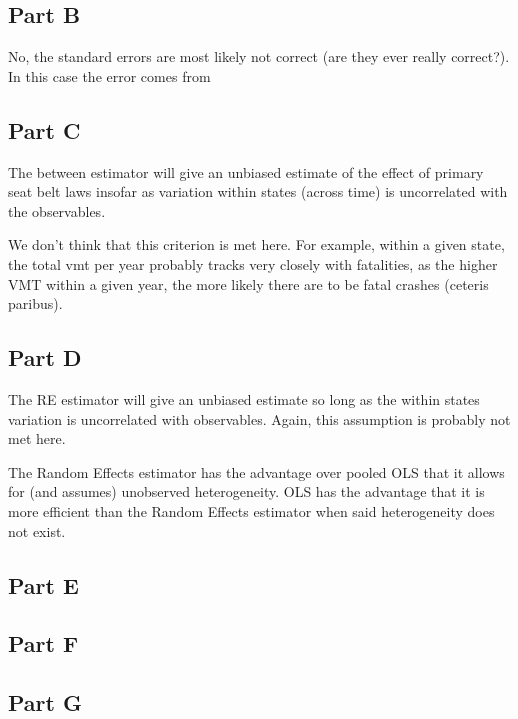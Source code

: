 \documentclass[letterpaper, 12pt]{article}
\begin{document}
\subsection{Part B}
No, the standard errors are most likely not correct (are they ever really correct?).  In this case the error comes from


\subsection{Part C}
The between estimator will give an unbiased estimate of the effect of primary seat belt laws insofar as variation within states (across time) is uncorrelated with the observables.


We don't think that this criterion is met here. For example, within a given state, the total vmt per year probably tracks very closely with fatalities, as the higher VMT within a given year, the more likely there are to be fatal crashes (ceteris paribus).


\subsection{Part D}
The RE estimator will give an unbiased estimate so long as the within states variation is uncorrelated with observables. Again, this assumption is probably not met here.


The Random Effects estimator has the advantage over pooled OLS that it allows for (and assumes) unobserved heterogeneity. OLS has the advantage that it is more efficient than the Random Effects estimator when said heterogeneity does not exist.

\subsection{Part E}

\subsection{Part F}



\subsection{Part G}
\end{document}
